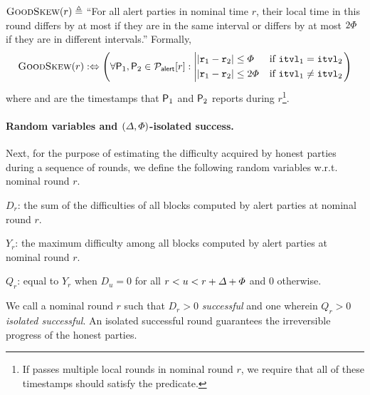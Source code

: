 \begin{definition}
\begin{cccItemize}[nosep]
        \item $\textsc{GoodSkew}(r) \triangleq$ ``For all alert parties in nominal time $r$, their local time in this round differs by at most \maxskew if they are in the same interval or differs by at most $2\varPhi$ if they are in different intervals.''
        Formally,
        \begin{equation*}
            \textsc{GoodSkew}(r) : \Leftrightarrow
            \left(
            \forall \mathsf{P}_1, \mathsf{P}_2 \in \mathcal{P}_{\mathsf{alert}}[r]:
            \left|
            \begin{aligned}
                 & | \mathtt{r}_1 - \mathtt{r}_2 | \le \varPhi  \\
                 & | \mathtt{r}_1 - \mathtt{r}_2 | \le 2\varPhi
            \end{aligned}
            \right.
            ~~
            \left.
            \begin{aligned}
                 & \text{if}~ \mathtt{itvl}_1 = \mathtt{itvl}_2    \\
                 & \text{if}~ \mathtt{itvl}_1 \neq \mathtt{itvl}_2
            \end{aligned}
            \right.
            \right)
        \end{equation*}
        where  and  are the timestamps that $\mathsf{P}_1$ and $\mathsf{P}_2$ reports during $r$\footnote{If \party passes multiple local rounds in nominal round $r$, we require that all of these timestamps should satisfy the predicate.}.
    \end{cccItemize}
\end{definition}

\paragraph{Random variables and $(\varDelta, \varPhi)$-isolated success.}
%
Next, for the purpose of estimating the difficulty acquired by honest parties during a sequence of rounds, we define the following random variables w.r.t. nominal round $r$.
%
\begin{cccItemize}[noitemsep]
    \item $D_r$: the sum of the difficulties of all blocks computed by alert parties at nominal round $r$.

    \item $Y_r$: the maximum difficulty among all blocks computed by alert parties at nominal round $r$.

    \item $Q_r$: equal to $Y_r$ when $D_u = 0$ for all $r < u < r + \varDelta + \varPhi$ and 0 otherwise.
\end{cccItemize}
%
We call a nominal round $r$ such that $D_r > 0$ \emph{successful} and one wherein $Q_r > 0$ \emph{isolated successful}.
%
An isolated successful round guarantees the irreversible progress of the honest parties.

